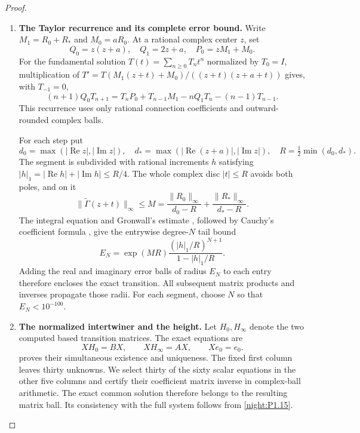 \begin{proof}
\begin{enumerate}[label={$\langle1\rangle$\arabic*.}]
\item \textbf{The Taylor recurrence and its complete error bound.}
Write $M_1=R_0+R_*$ and $M_0=aR_0$.  At a rational complex center
$z$, set
\[
 Q_0=z(z+a),\quad Q_1=2z+a,\quad P_0=zM_1+M_0.
\]
For the fundamental solution $T(t)=\sum_{n\ge0}T_nt^n$ normalized
by $T_0=I$, multiplication of
$T'=T(M_1(z+t)+M_0)/((z+t)(z+a+t))$ gives, with $T_{-1}=0$,
\[
 (n+1)Q_0T_{n+1}
 =T_nP_0+T_{n-1}M_1-nQ_1T_n-(n-1)T_{n-1}.
\]
This recurrence uses only rational connection coefficients and
outward-rounded complex balls.

For each step put
\[
 d_0=\max(|\operatorname{Re}z|,|\operatorname{Im}z|),\quad
 d_*=\max(|\operatorname{Re}(z+a)|,|\operatorname{Im}z|),
 \quad R=\tfrac12\min(d_0,d_*).
\]
The segment is subdivided with rational increments $h$ satisfying
$|h|_1=|\operatorname{Re}h|+|\operatorname{Im}h|\le R/4$.
The whole complex disc $|t|\le R$ avoids both poles, and on it
\[
 \|\widetilde\Gamma(z+t)\|_\infty\le
 M=\frac{\|R_0\|_\infty}{d_0-R}
   +\frac{\|R_*\|_\infty}{d_*-R}.
\]
The integral equation and Gronwall's estimate
\cite[Lemma~2.7, pp.~42--43]{TeschlODE2012}, followed by Cauchy's
coefficient formula
\cite[\S1.9(iii), (1.9.30)--(1.9.31)]{DLMFCauchy2026}, give the
entrywise degree-$N$ tail bound
\[
 E_N=\exp(MR)\frac{(|h|_1/R)^{N+1}}{1-|h|_1/R}.
 \tag{1.16.1}
\]
Adding the real and imaginary error balls of radius $E_N$ to each
entry therefore encloses the exact transition.  All subsequent
matrix products and inverses propagate those radii. For each
segment, choose $N$ so that $E_N<10^{-100}$.  

\item \textbf{The normalized intertwiner and the height.}
Let $H_0,H_\infty$ denote the two computed based transition matrices.
The exact equations are
\[
 XH_0=BX,\qquad XH_\infty=AX,\qquad Xe_0=e_0.
\]
 proves their simultaneous existence and uniqueness.  The
fixed first column leaves thirty unknowns.  We select thirty of
the sixty scalar equations in the other five columns and certify
their coefficient matrix inverse in complex-ball arithmetic.
The exact common solution therefore belongs to the resulting
matrix ball. Its consistency with the full system follows from
\cref{night:P1.15}.


\end{enumerate}
\end{proof}
